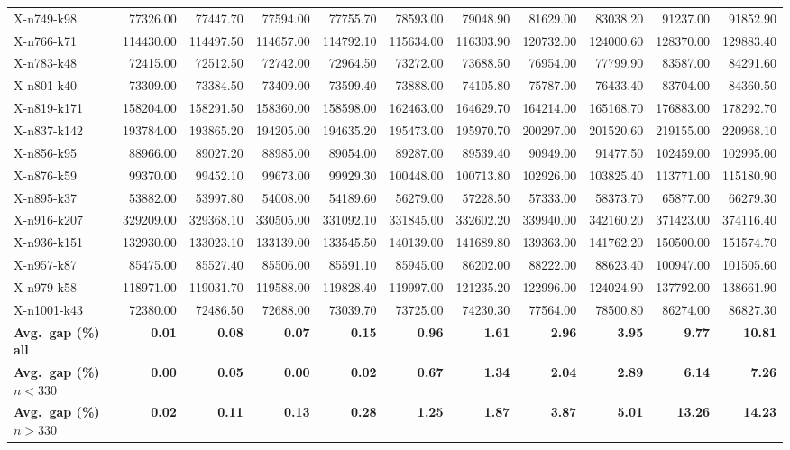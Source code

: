 \documentclass[letterpaper]{article} %
\begin{document}
\begin{longtable}{@{}l rr rr rr rr rr@{}}
X-n749-k98 & 77326.00 & 77447.70 & 77594.00 & 77755.70 & 78593.00 & 79048.90 & 81629.00 & 83038.20 & 91237.00 & 91852.90 \\
X-n766-k71 & 114430.00 & 114497.50 & 114657.00 & 114792.10 & 115634.00 & 116303.90 & 120732.00 & 124000.60 & 128370.00 & 129883.40 \\
X-n783-k48 & 72415.00 & 72512.50 & 72742.00 & 72964.50 & 73272.00 & 73688.50 & 76954.00 & 77799.90 & 83587.00 & 84291.60 \\
X-n801-k40 & 73309.00 & 73384.50 & 73409.00 & 73599.40 & 73888.00 & 74105.80 & 75787.00 & 76433.40 & 83704.00 & 84360.50 \\
X-n819-k171 & 158204.00 & 158291.50 & 158360.00 & 158598.00 & 162463.00 & 164629.70 & 164214.00 & 165168.70 & 176883.00 & 178292.70 \\
X-n837-k142 & 193784.00 & 193865.20 & 194205.00 & 194635.20 & 195473.00 & 195970.70 & 200297.00 & 201520.60 & 219155.00 & 220968.10 \\
X-n856-k95 & 88966.00 & 89027.20 & 88985.00 & 89054.00 & 89287.00 & 89539.40 & 90949.00 & 91477.50 & 102459.00 & 102995.00 \\
X-n876-k59 & 99370.00 & 99452.10 & 99673.00 & 99929.30 & 100448.00 & 100713.80 & 102926.00 & 103825.40 & 113771.00 & 115180.90 \\
X-n895-k37 & 53882.00 & 53997.80 & 54008.00 & 54189.60 & 56279.00 & 57228.50 & 57333.00 & 58373.70 & 65877.00 & 66279.30 \\
X-n916-k207 & 329209.00 & 329368.10 & 330505.00 & 331092.10 & 331845.00 & 332602.20 & 339940.00 & 342160.20 & 371423.00 & 374116.40 \\
X-n936-k151 & 132930.00 & 133023.10 & 133139.00 & 133545.50 & 140139.00 & 141689.80 & 139363.00 & 141762.20 & 150500.00 & 151574.70 \\
X-n957-k87 & 85475.00 & 85527.40 & 85506.00 & 85591.10 & 85945.00 & 86202.00 & 88222.00 & 88623.40 & 100947.00 & 101505.60 \\
X-n979-k58 & 118971.00 & 119031.70 & 119588.00 & 119828.40 & 119997.00 & 121235.20 & 122996.00 & 124024.90 & 137792.00 & 138661.90 \\
X-n1001-k43 & 72380.00 & 72486.50 & 72688.00 & 73039.70 & 73725.00 & 74230.30 & 77564.00 & 78500.80 & 86274.00 & 86827.30 \\
\midrule
\textbf{Avg.\ gap (\%) all} & \textbf{0.01} & \textbf{0.08} & \textbf{0.07} & \textbf{0.15} & \textbf{0.96} & \textbf{1.61} & \textbf{2.96} & \textbf{3.95} & \textbf{9.77} & \textbf{10.81} \\
\textbf{Avg.\ gap (\%) $n<330$} & \textbf{0.00} & \textbf{0.05} & \textbf{0.00} & \textbf{0.02} & \textbf{0.67} & \textbf{1.34} & \textbf{2.04} & \textbf{2.89} & \textbf{6.14} & \textbf{7.26} \\
\textbf{Avg.\ gap (\%) $n>330$} & \textbf{0.02} & \textbf{0.11} & \textbf{0.13} & \textbf{0.28} & \textbf{1.25} & \textbf{1.87} & \textbf{3.87} & \textbf{5.01} & \textbf{13.26} & \textbf{14.23} \\
\end{longtable}
\twocolumn
\normalsize
\end{document}
